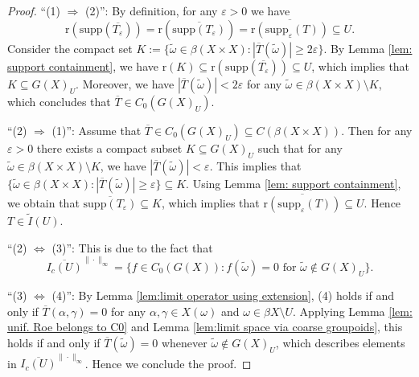 \documentclass[12pt, a4paper]{amsart}
\numberwithin{equation}{section}
\theoremstyle{definition}
\theoremstyle{remark}
\def\B{\mathfrak{B}}
\def\supp{\mathrm{supp}}
\def\r{\mathrm{r}}
\begin{document}
\begin{proof}
``(1) $\Rightarrow$ (2)'': By definition, for any $\varepsilon>0$ we have 
\[
\r(\supp(\overline{T_\varepsilon})) = \r(\overline{\supp(T_\varepsilon)}) = \overline{\r(\supp_\varepsilon(T))} \subseteq U.
\]
Consider the compact set $K:=\{\tilde{\omega} \in \beta(X \times X): |\overline{T}(\tilde{\omega})| \geq 2\varepsilon\}$. By Lemma \ref{lem: support containment}, we have $\r(K) \subseteq \r(\supp(\overline{T_\varepsilon})) \subseteq U$, which implies that $K\subseteq G(X)_U$. 
Moreover, we have $|\overline{T}(\tilde{\omega})|<2\varepsilon$ for any $\tilde{\omega} \in \beta(X \times X) \setminus K$, which concludes that $\overline{T} \in C_0(G(X)_U)$.

``(2) $\Rightarrow$ (1)'': Assume that $\overline{T} \in C_0(G(X)_U) \subseteq C(\beta(X \times X))$. Then for any $\varepsilon>0$ there exists a compact subset $K \subseteq G(X)_U$ such that for any $\tilde{\omega} \in \beta(X \times X) \setminus K$, we have $|\overline{T}(\tilde{\omega})| < \varepsilon$. This implies that $\{\tilde{\omega} \in \beta(X \times X): |\overline{T}(\tilde{\omega})| \geq \varepsilon\} \subseteq K$. Using Lemma \ref{lem: support containment}, we obtain that $\overline{\supp(T_\varepsilon)} \subseteq K$, which implies that $\overline{\r(\supp_\varepsilon(T))} \subseteq U$. Hence $T \in \tilde{I}(U)$.

``(2) $\Leftrightarrow$ (3)'': This is due to the fact that 
\[
\overline{I_c(U)}^{\|\cdot\|_\infty} = \{f \in C_0(G(X)): f(\tilde{\omega})=0 \text{ for } \tilde{\omega} \notin G(X)_U\}.
\]

``(3) $\Leftrightarrow$ (4)'': By Lemma \ref{lem:limit operator using extension}, (4) holds if and only if $\overline{T}(\alpha, \gamma) = 0$ for any $\alpha, \gamma \in X(\omega)$ and $\omega \in \beta X \setminus U$. Applying Lemma \ref{lem: unif. Roe belongs to C0} and Lemma \ref{lem:limit space via coarse groupoids}, this holds if and only if $\overline{T}(\tilde{\omega}) = 0$ whenever $\tilde{\omega} \notin G(X)_U$, which describes elements in $\overline{I_c(U)}^{\|\cdot\|_\infty}$. Hence we conclude the proof.
\end{proof}
\end{document}
